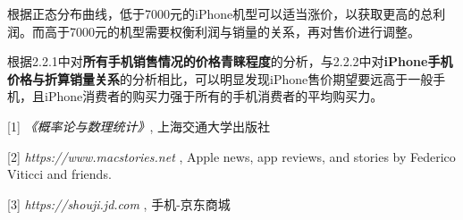 \documentclass[12pt]{ctexart}
\begin{document}
    根据正态分布曲线，低于7000元的iPhone机型可以适当涨价，以获取更高的总利润。而高于7000元的机型需要权衡利润与销量的关系，再对售价进行调整。

    根据2.2.1中对\textbf{所有手机销售情况的价格青睐程度}的分析，与2.2.2中对\textbf{iPhone手机价格与折算销量关系}的分析相比，可以明显发现iPhone售价期望要远高于一般手机，且iPhone消费者的购买力强于所有的手机消费者的平均购买力。

    

    

\newpage

\begin{thebibliography}{99}

    [1]  \textsl{《概率论与数理统计》}, 上海交通大学出版社

    \newline

    [2]  \textsl{https://www.macstories.net}  , Apple news, app reviews, and stories by Federico Viticci and friends.

    \newline

    [3] \textsl{https://shouji.jd.com} , 手机-京东商城

\end{thebibliography}
\end{document}
